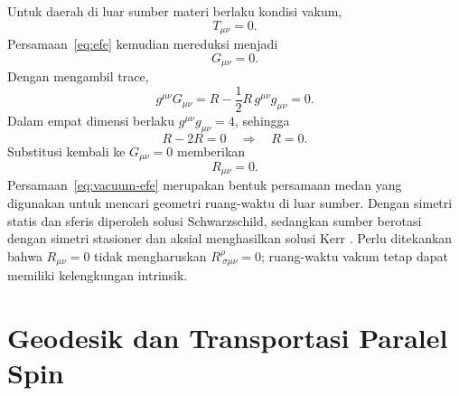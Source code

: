 Untuk daerah di luar sumber materi berlaku kondisi vakum,
\begin{equation}
    T_{\mu\nu}=0.
\end{equation}
Persamaan~\eqref{eq:efe} kemudian mereduksi menjadi
\begin{equation}
    G_{\mu\nu}=0.
\end{equation}
Dengan mengambil trace,
\begin{equation}
    g^{\mu\nu}G_{\mu\nu}
    =R-\frac{1}{2}R\,g^{\mu\nu}g_{\mu\nu}=0.
\end{equation}
Dalam empat dimensi berlaku $g^{\mu\nu}g_{\mu\nu}=4$, sehingga
\begin{equation}
    R-2R=0
    \quad\Longrightarrow\quad
    R=0.
\end{equation}
Substitusi kembali ke $G_{\mu\nu}=0$ memberikan
\begin{equation}
    R_{\mu\nu}=0.
    \label{eq:vacuum-efe}
\end{equation}
Persamaan~\eqref{eq:vacuum-efe} merupakan bentuk persamaan medan yang
digunakan untuk mencari geometri ruang-waktu di luar sumber. Dengan
simetri statis dan sferis diperoleh solusi Schwarzschild, sedangkan
sumber berotasi dengan simetri stasioner dan aksial menghasilkan solusi
Kerr \parencite{Schwarzschild1916Field,Kerr1963KerrMetric}. Perlu
ditekankan bahwa $R_{\mu\nu}=0$ tidak mengharuskan
$R^\rho_{\ \sigma\mu\nu}=0$; ruang-waktu vakum tetap dapat memiliki
kelengkungan intrinsik.


\section{Geodesik dan Transportasi Paralel Spin}
\label{sec:geodesik-spin}

